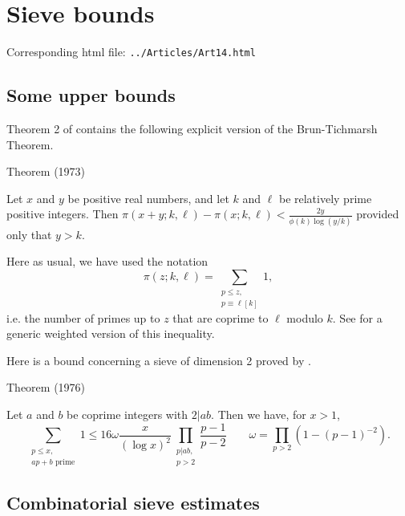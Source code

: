 \chapter{  Sieve bounds}

Corresponding html file: \texttt{../Articles/Art14.html}










 
 

\par 
\section{Some upper bounds}


Theorem 2 of \cite{Montgomery-Vaughan*73} contains the
following explicit version of the Brun-Tichmarsh Theorem.
\par 
\begin{thm}{Theorem (1973)}

Let $x$ and $y$ be positive real numbers, and let $k$ and $\ell$ be relatively
prime positive integers. Then 
$
\pi(x+y;k,\ell)-\pi(x;k,\ell)
<  \frac{2y}{\phi(k)\log (y/k)}
$ provided only that $y>k$.
\end{thm}

Here as usual, we have used the notation
$$
\pi(z;k,\ell)=\sum_{\substack{p\le z,\\ p\equiv \ell [k]}}1,
$$
i.e. the number of primes up to $z$ that are coprime to $\ell$ modulo $k$.
See
\cite{Buethe*14}
for a generic weighted version of this inequality.

\par 
Here is a bound concerning a sieve of dimension 2 proved by
\cite{Siebert*76}.
\par 
\begin{thm}{Theorem (1976)}

Let $a$ and $b$ be coprime integers with $2|ab$. Then we have, for $x>1$,
$$
\sum_{\substack{p\le x,\\ \text{$ap+b$ prime}}}1
\le 16 \omega\frac{x}{(\log x)^2}\prod_{\substack{p|ab,\\ p >
2}}\frac{p-1}{p-2}
\qquad \omega=\prod_{p > 2}(1-(p-1)^{-2}).
$$
\end{thm}



\section{Combinatorial sieve estimates}


